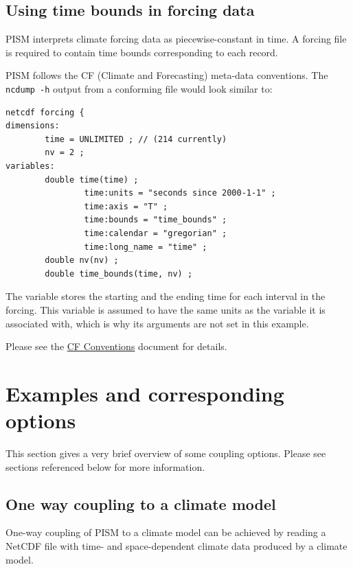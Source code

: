 \documentclass[titlepage,letterpaper,final]{scrartcl}
\begin{document}
\subsection{Using time bounds in forcing data}
\label{sec:time-bounds}

PISM interprets climate forcing data as piecewise-constant in time. A forcing
file is required to contain time bounds corresponding to each record.

PISM follows the CF (Climate and Forecasting) meta-data conventions. The
\texttt{ncdump -h} output from a conforming file would look similar to:
\begin{verbatim}
netcdf forcing {
dimensions:
        time = UNLIMITED ; // (214 currently)
        nv = 2 ;
variables:
        double time(time) ;
                time:units = "seconds since 2000-1-1" ;
                time:axis = "T" ;
                time:bounds = "time_bounds" ;
                time:calendar = "gregorian" ;
                time:long_name = "time" ;
        double nv(nv) ;
        double time_bounds(time, nv) ;
\end{verbatim}

The  variable stores the starting and the ending time for
each interval in the forcing. This variable is assumed to have the same units
as the  variable it is associated with, which is why its arguments
are not set in this example.

Please see the
\href{http://cf-pcmdi.llnl.gov/documents/cf-conventions/1.6/cf-conventions.html#cell-boundaries}{CF
Conventions} document for details.




\clearpage\newpage
\section{Examples and corresponding options}
\label{sec:examples}

This section gives a very brief overview of some coupling options. Please see sections referenced below for more information.

\subsection{One way coupling to a climate model}
\label{sec:one-way-coupling}

One-way coupling of PISM to a climate model can be achieved by reading a NetCDF
file with time- and space-dependent climate data produced by a climate model.
\end{document}
